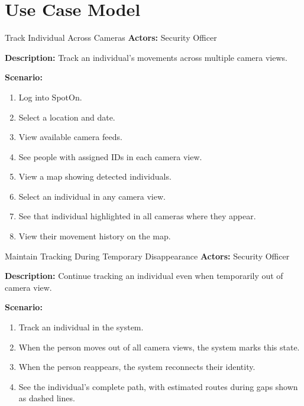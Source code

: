 \section{Use Case Model}
\label{section:use-case-model}

\begin{usecase}{Track Individual Across Cameras}
    \textbf{Actors:} Security Officer

    \textbf{Description:} Track an individual's movements across multiple camera views.

    \textbf{Scenario:}
    \begin{enumerate}[leftmargin=80pt]
        \item Log into SpotOn.
        \item Select a location and date.
        \item View available camera feeds.
        \item See people with assigned IDs in each camera view.
        \item View a map showing detected individuals.
        \item Select an individual in any camera view.
        \item See that individual highlighted in all cameras where they appear.
        \item View their movement history on the map.
    \end{enumerate}
\end{usecase}

\begin{usecase}{Maintain Tracking During Temporary Disappearance}
    \textbf{Actors:} Security Officer

    \textbf{Description:} Continue tracking an individual even when temporarily out of camera view.

    \textbf{Scenario:}
    \begin{enumerate}[leftmargin=80pt]
        \item Track an individual in the system.
        \item When the person moves out of all camera views, the system marks this state.
        \item When the person reappears, the system reconnects their identity.
        \item See the individual's complete path, with estimated routes during gaps shown as dashed lines.
    \end{enumerate}
\end{usecase}

